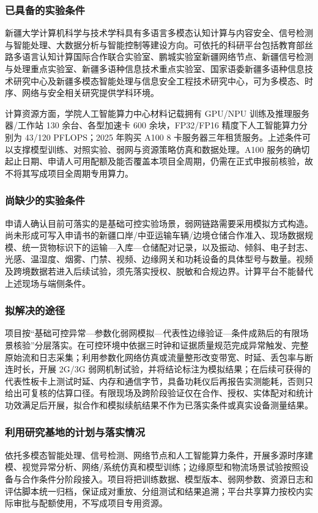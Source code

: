\justifying
\NSFCBodyText

\subsubsection{已具备的实验条件}

新疆大学计算机科学与技术学科具有多语言多模态认知计算与内容安全、信号检测与智能处理、大数据分析与智能控制等建设方向。可依托的科研平台包括教育部丝路多语言认知计算国际合作联合实验室、鹏城实验室新疆网络节点、新疆信号检测与处理重点实验室、新疆多语种信息技术重点实验室、国家语委新疆多语种信息技术研究中心及新疆多模态智能处理与信息安全工程技术研究中心，可为多模态、时序、网络与安全相关研究提供学科环境。

计算资源方面，学院人工智能算力中心材料记载拥有 GPU/NPU 训练及推理服务器/工作站 130 余台、各型加速卡 600 余块，FP32/FP16 精度下人工智能算力分别为 43/120 PFLOPS；2025 年购买 A100 8 卡服务器三年租赁服务。上述条件可以支撑模型训练、对照实验、弱网与资源策略仿真和数据处理。A100 服务的确切起止日期、申请人可用配额及能否覆盖本项目全周期，仍需在正式申报前核验，故不将其写成项目全周期专用算力。

\subsubsection{尚缺少的实验条件}

申请人确认目前可落实的是基础可控实验场景，弱网链路需要采用模拟方式构造。尚未形成可写入申请书的新疆口岸/中亚运输车辆/边境仓储合作准入、现场数据规模、统一货物标识下的运输—入库—仓储配对记录，以及振动、倾斜、电子封志、光感、温湿度、烟雾、门禁、视频、边缘网关和功耗设备的具体型号与数量。视频及跨境数据若进入后续试验，须先落实授权、脱敏和合规边界。计算平台不能替代上述现场与端侧条件。

\subsubsection{拟解决的途径}

项目按“基础可控异常—参数化弱网模拟—代表性边缘验证—条件成熟后的有限场景核验”分层落实。在可控环境中依据三时钟和证据质量规范完成异常触发、完整原始流和日志采集；利用参数化网络仿真或流量整形改变带宽、时延、丢包率与断连时长，开展 2G/3G 弱网机制试验，并将结论标注为模拟结果；在后续可获得的代表性板卡上测试时延、内存和通信字节，具备功耗仪后再报告实测能耗，否则只给出可复核的估算口径。有限现场及跨阶段验证仅在合作、授权、实体配对和统计功效满足后开展，拟合作和模拟续航结果不作为已落实条件或真实设备测量结果。

\subsubsection{利用研究基地的计划与落实情况}

依托多模态智能处理、信号检测、网络节点和人工智能算力条件，开展多源时序建模、视觉异常分析、网络/系统仿真和模型训练；边缘原型和物流场景试验按照设备与合作条件分阶段接入。项目将把训练数据、模型版本、弱网参数、资源日志和评估脚本统一归档，保证成对重放、分组测试和结果追溯；平台共享算力按校内实际审批与配额使用，不写成项目专用资源。
